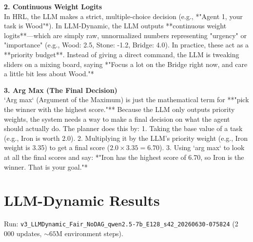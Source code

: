\documentclass{article}
\begin{document}
\textbf{2. Continuous Weight Logits} \\
In HRL, the LLM makes a strict, multiple-choice decision (e.g., *"Agent 1, your task is Wood"*). 
In LLM-Dynamic, the LLM outputs **continuous weight logits**—which are simply raw, unnormalized numbers representing "urgency" or "importance" (e.g., Wood: 2.5, Stone: -1.2, Bridge: 4.0). In practice, these act as a **priority budget**. Instead of giving a direct command, the LLM is tweaking sliders on a mixing board, saying *"Focus a lot on the Bridge right now, and care a little bit less about Wood."*

\textbf{3. Arg Max (The Final Decision)} \\
`Arg max` (Argument of the Maximum) is just the mathematical term for **"pick the winner with the highest score."**
Because the LLM only outputs priority weights, the system needs a way to make a final decision on what the agent should actually do. The planner does this by:
1. Taking the base value of a task (e.g., Iron is worth 2.0).
2. Multiplying it by the LLM's priority weight (e.g., Iron weight is 3.35) to get a final score ($2.0 \times 3.35 = 6.70$).
3. Using `arg max` to look at all the final scores and say: *"Iron has the highest score of 6.70, so Iron is the winner. That is your goal."*

\newpage
\section{LLM-Dynamic Results}

Run: \texttt{v3\_LLMDynamic\_Fair\_NoDAG\_qwen2.5-7b\_E128\_s42\_20260630-075824} (2\,000 updates, ${\sim}65$M environment steps).
\end{document}
